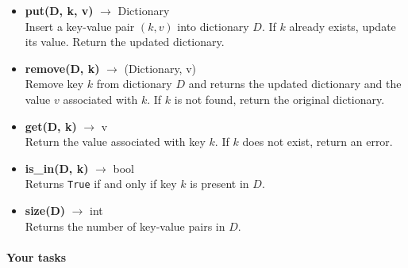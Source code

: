 \documentclass[oneside,11pt,dvipsnames]{book}
\begin{document}
\begin{itemize}
    \item \textbf{put(D, k, v)} $\rightarrow$ Dictionary \\
          Insert a key-value pair $(k, v)$ into dictionary $D$. If $k$ already exists, update its value. Return the updated dictionary.
    \item \textbf{remove(D, k)} $\rightarrow$ (Dictionary, v) \\
          Remove key $k$ from dictionary $D$ and returns the updated dictionary and the value $v$ associated with $k$. If $k$ is not found, return the original dictionary.          
    \item \textbf{get(D, k)} $\rightarrow$ v \\
          Return the value associated with key $k$. If $k$ does not exist, return an error.
    \item \textbf{is\_in(D, k)} $\rightarrow$ bool \\
          Returns \texttt{True} if and only if key $k$ is present in $D$.
    \item \textbf{size(D)} $\rightarrow$ int \\
          Returns the number of key-value pairs in $D$.
\end{itemize}


\paragraph{Your tasks} 
\end{document}
